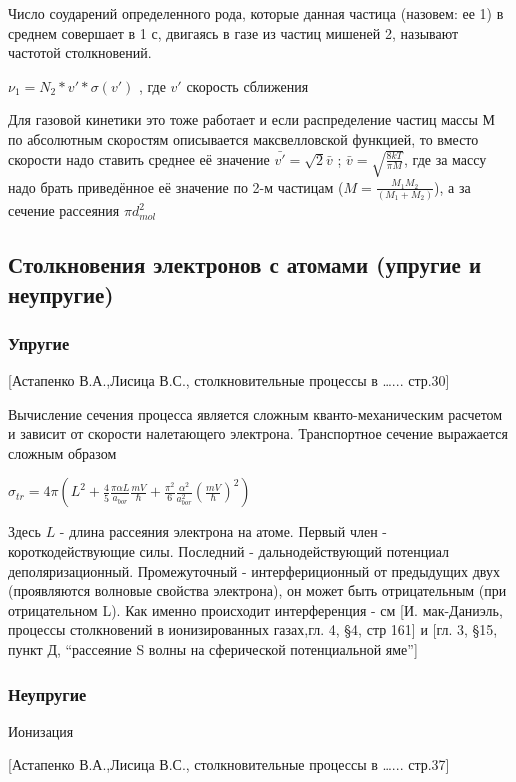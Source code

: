 \documentclass[10pt, a4paper]{article}
\begin{document}
Число соударений определенного рода, которые данная частица (назовем: ее 1) в среднем совершает в 1 с, двигаясь в газе из частиц мишеней 2, называют частотой столкновений.

$\nu_{1}=N_{2}*v'*\sigma (v')$
, где $v'$ скорость сближения

Для газовой кинетики это тоже работает и если распределение частиц массы М по абсолютным скоростям описывается максвелловской функцией, то вместо скорости надо ставить среднее её значение $\bar{v'}=\sqrt{2} \bar{v}$ ; $\bar{v}=\sqrt{\frac{8kT}{\pi M}}$, где за массу надо брать приведённое её значение по 2-м частицам ($ M=\frac{M_{1} M_{2}}{(M_{1}+M_{2})} $), а за сечение рассеяния $\pi d_{mol}^{2} $

\subsection{Столкновения электронов с атомами (упругие и неупругие)}
\label{sec.2.3}


\subsubsection{Упругие}
\label{sec.2.3.1}
[Астапенко В.А.,Лисица В.С., столкновительные процессы в …... стр.30]


Вычисление сечения процесса является сложным кванто-механическим расчетом и зависит от скорости налетающего электрона. Транспортное сечение выражается сложным образом

$\sigma_{tr}=4\pi (L^{2}+\frac{4}{5}\frac{\pi \alpha L}{a_{bor}}\frac{mV}{\hbar}+\frac{\pi^{2}}{6}\frac{\alpha^{2}}{a_{bor}^{2}}(\frac{mV}{\hbar})^{2})$

Здесь $L$ - длина рассеяния электрона на атоме. Первый член - короткодействующие силы. Последний - дальнодействующий потенциал деполяризационный. Промежуточный - интерфериционный от предыдущих двух (проявляются волновые свойства электрона), он может быть отрицательным (при отрицательном L).
Как именно происходит интерференция - см [И. мак-Даниэль, процессы столкновений в ионизированных газах,гл. 4, §4, стр 161] и [гл. 3, §15, пункт Д, “рассеяние  S волны на сферической потенциальной яме”]

\subsubsection{Неупругие}
\label{sec.2.3.2}

Ионизация

[Астапенко В.А.,Лисица В.С., столкновительные процессы в …... стр.37]
\end{document}
